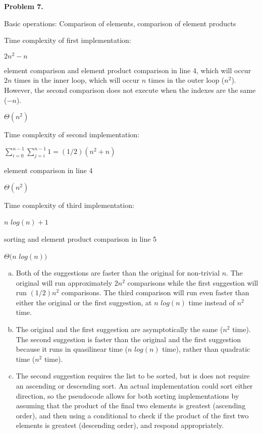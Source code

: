 \documentclass{article}
\begin{document}
\newpage

\textbf{Problem 7.}

	Basic operations:  Comparison of elements, comparison of element products
	
	Time complexity of first implementation:
	
	\hspace{4ex} $2n^2 - n$
	
	\hspace{4ex} element comparison and element product comparison in line 4, which will occur $2n$ times in the inner loop, which will occur $n$ times in the outer loop ($n^2$).  However, the second comparison does not execute when the indexes are the same ($-n$).
	
	\hspace{4ex} $\Theta(n^2)$
	
	Time complexity of second implementation:
	
	\hspace{4ex} $\sum_{i=0}^{n - 1} \sum_{j = i}^{n - 1} 1 = (1/2)(n^2 + n)$
	
	\hspace{4ex} element comparison in line 4
	
	\hspace{4ex} $\Theta(n^2)$
	
	Time complexity of third implementation:
	
	\hspace{4ex} $n$ $log(n) + 1$
	
	\hspace{4ex} sorting and element product comparison in line 5
	
	\hspace{4ex} $\Theta(n$ $log(n))$
	
	\begin{enumerate}[a.]
		\item Both of the suggestions are faster than the original for non-trivial $n$.  The original will run approximately $2n^2$ comparisons while the first suggestion will run $(1/2)n^2$ comparisons.  The third comparison will run even faster than either the original or the first suggestion, at $n$ $log(n)$ time instead of $n^2$ time.
		
		\item The original and the first suggestion are asymptotically the same ($n^2$ time).  The second suggestion is faster than the original and the first suggestion because it runs in quasilinear time ($n$ $log(n)$ time), rather than quadratic time ($n^2$ time).
		
		\item The second suggestion requires the list to be sorted, but is does not require an ascending or descending sort.  An actual implementation could sort either direction, so the pseudocode allows for both sorting implementations by assuming that the product of the final two elements is greatest (ascending order), and then using a conditional to check if the product of the first two elements is greatest (descending order), and respond appropriately.
	\end{enumerate}
\end{document}
